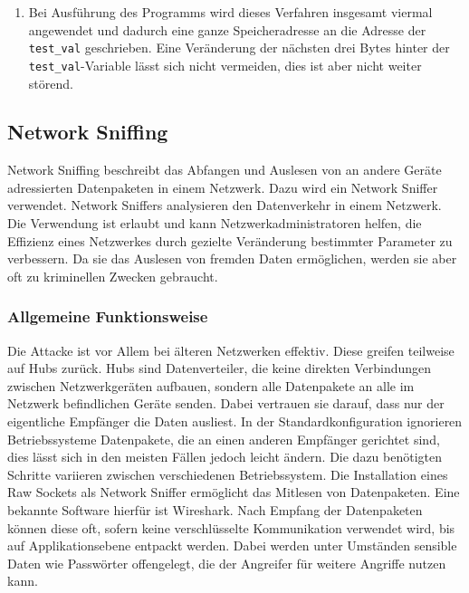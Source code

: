 \documentclass[11pt, a4paper]{article}
\begin{document}
\begin{enumerate}
	\paragraph{Wrapping Around}
	Ein Byte entspricht einem Zeichen bestehend aus acht \gls{bit}. Die Binärzahl \texttt{11111111} entspricht der Dezimalzahl \(255\). Bei Erhöhung um eins bekommt die Binärzahl ein neuntes Zeichen und sieht wie folgt aus: \texttt{100000000}. In diesem Fall sind nur die letzten acht \glspl{bit} von Bedeutung. Diese bleiben bei einer Erhöhung der Zahl um die Dezimalzahl \(256\) gleich. Dadurch lässt sich das Problem der bereits zu hohen Anzahl gedruckter Zeichen eifach lösen, indem statt der ursprünglichen Zahl die nächsthöhere Zahl in Schritten von 256 verwendet wird. 
	
	\item Bei Ausführung des Programms wird dieses Verfahren insgesamt viermal angewendet und dadurch eine ganze Speicheradresse an die Adresse der \texttt{test\_val} geschrieben. Eine Veränderung der nächsten drei Bytes hinter der \texttt{test\_val}-Variable lässt sich nicht vermeiden, dies ist aber nicht weiter störend. 
\end{enumerate}

\subsection{Network Sniffing}\label{subsec:networksniffing}
Network Sniffing beschreibt das Abfangen und Auslesen von an andere Geräte adressierten Datenpaketen in einem Netzwerk. Dazu wird ein Network Sniffer verwendet. Network Sniffers analysieren den Datenverkehr in einem Netzwerk. Die Verwendung ist erlaubt und kann Netzwerkadministratoren helfen, die Effizienz eines Netzwerkes durch gezielte Veränderung bestimmter Parameter zu verbessern. Da sie das Auslesen von fremden Daten ermöglichen, werden sie aber oft zu kriminellen Zwecken gebraucht.
\subsubsection{Allgemeine Funktionsweise}
Die Attacke ist vor Allem bei älteren Netzwerken effektiv. Diese greifen teilweise auf Hubs zurück. Hubs sind Datenverteiler, die keine direkten Verbindungen zwischen Netzwerkgeräten aufbauen, sondern alle Datenpakete an alle im Netzwerk befindlichen Geräte senden. Dabei vertrauen sie darauf, dass nur der eigentliche Empfänger die Daten ausliest. In der Standardkonfiguration ignorieren Betriebssysteme Datenpakete, die an einen anderen Empfänger gerichtet sind, dies lässt sich in den meisten Fällen jedoch leicht ändern. Die dazu benötigten Schritte variieren zwischen verschiedenen Betriebssystem. Die Installation eines Raw Sockets als Network Sniffer ermöglicht das Mitlesen von Datenpaketen. Eine bekannte Software hierfür ist Wireshark. Nach Empfang der Datenpaketen können diese oft, sofern keine verschlüsselte Kommunikation verwendet wird, bis auf Applikationsebene entpackt werden. Dabei werden unter Umständen sensible Daten wie Passwörter offengelegt, die der Angreifer für weitere Angriffe nutzen kann. 
\end{document}
